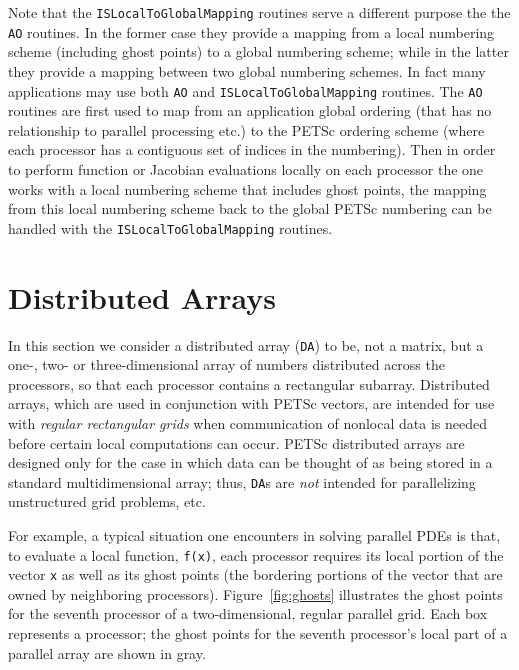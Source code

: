 Note that the {\tt ISLocalToGlobalMapping} routines serve a different purpose
the the {\tt AO}  routines. In the former case they provide a mapping 
from  a local numbering scheme (including ghost points) to a global numbering scheme;
while in the latter they provide a mapping between two global numbering schemes.
In fact many applications may use both {\tt AO} and {\tt ISLocalToGlobalMapping} routines.
The {\tt AO} routines are first used to map from an application global ordering 
(that has no relationship to parallel processing etc.) to the PETSc ordering scheme
(where each processor has a contiguous set of indices in the numbering). Then in order
to perform function or Jacobian evaluations locally on each processor the one works
with a local numbering scheme that includes ghost points, the mapping from this local
numbering scheme back to the global PETSc numbering can be handled with the 
{\tt ISLocalToGlobalMapping} routines.

\section{Distributed Arrays}
\label{sec:da}

In this section we consider a distributed array ({\tt DA}) to be,
not a matrix, but a one-, two- or three-dimensional array of numbers
distributed across the processors, so that each processor contains a
rectangular subarray.  Distributed arrays, which are used in
conjunction with PETSc vectors, are intended for use with {\em
regular rectangular grids} when communication of nonlocal data is
needed before certain local computations can occur.  PETSc distributed
arrays are designed only for the case in which data can be thought of
as being stored in a standard multidimensional array; thus, {\tt DA}s 
are {\em not} intended for parallelizing unstructured grid problems, etc.

For example, a typical situation one encounters in solving parallel
PDEs is that, to evaluate a local function, {\tt f(x)}, each processor
requires its local portion of the vector {\tt x} as well as its ghost
points  (the bordering portions of the vector
that are owned by neighboring processors).  Figure~\ref{fig:ghosts}
illustrates the ghost points for the seventh processor of a
two-dimensional, regular parallel grid.  Each box represents a
processor; the ghost points for the seventh processor's local part of
a parallel array are shown in gray.

